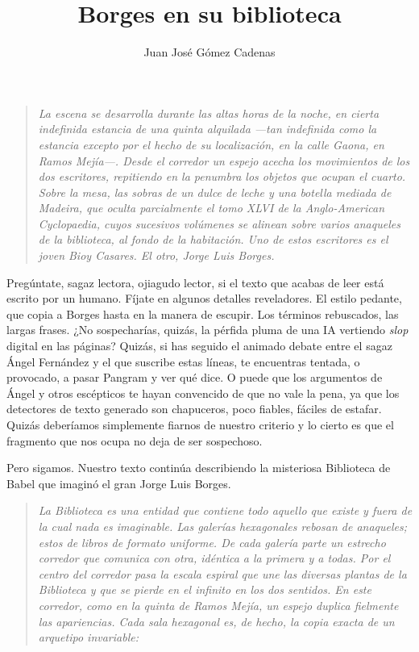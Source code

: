 \documentclass[11pt,a4paper]{article}
\title{Borges en su biblioteca}
\author{Juan José Gómez Cadenas}
\date{}
\begin{document}
\maketitle

\begin{quotation}\itshape
La escena se desarrolla durante las altas horas de la noche, en cierta indefinida estancia de una quinta alquilada ---tan indefinida como la estancia excepto por el hecho de su localización, en la calle Gaona, en Ramos Mejía---. Desde el corredor un espejo acecha los movimientos de los dos escritores, repitiendo en la penumbra los objetos que ocupan el cuarto. Sobre la mesa, las sobras de un dulce de leche y una botella mediada de Madeira, que oculta parcialmente el tomo XLVI de la Anglo-American Cyclopaedia, cuyos sucesivos volúmenes se alinean sobre varios anaqueles de la biblioteca, al fondo de la habitación. Uno de estos escritores es el joven Bioy Casares. El otro, Jorge Luis Borges.
\end{quotation}

Pregúntate, sagaz lectora, ojiagudo lector, si el texto que acabas de leer está escrito por un humano. Fíjate en algunos detalles reveladores. El estilo pedante, que copia a Borges hasta en la manera de escupir. Los términos rebuscados, las largas frases. ¿No sospecharías, quizás, la pérfida pluma de una IA vertiendo \emph{slop} digital en las páginas?
Quizás, si has seguido el animado debate entre el sagaz Ángel Fernández y el que suscribe estas líneas, te encuentras tentada, o provocado, a pasar Pangram y ver qué dice. O puede que los argumentos de Ángel y otros escépticos te hayan convencido de que no vale la pena, ya que los detectores de texto generado son chapuceros, poco fiables, fáciles de estafar. Quizás deberíamos simplemente fiarnos de nuestro criterio y lo cierto es que el fragmento que nos ocupa no deja de ser sospechoso.

Pero sigamos. Nuestro texto continúa describiendo la misteriosa Biblioteca de Babel que imaginó el gran Jorge Luis Borges.

\begin{quotation}\itshape
La Biblioteca es una entidad que contiene todo aquello que existe y fuera de la cual nada es imaginable. Las galerías hexagonales rebosan de anaqueles; estos de libros de formato uniforme. De cada galería parte un estrecho corredor que comunica con otra, idéntica a la primera y a todas. Por el centro del corredor pasa la escala espiral que une las diversas plantas de la Biblioteca y que se pierde en el infinito en los dos sentidos. En este corredor, como en la quinta de Ramos Mejía, un espejo duplica fielmente las apariencias. Cada sala hexagonal es, de hecho, la copia exacta de un arquetipo invariable:
\end{quotation}
\end{document}
